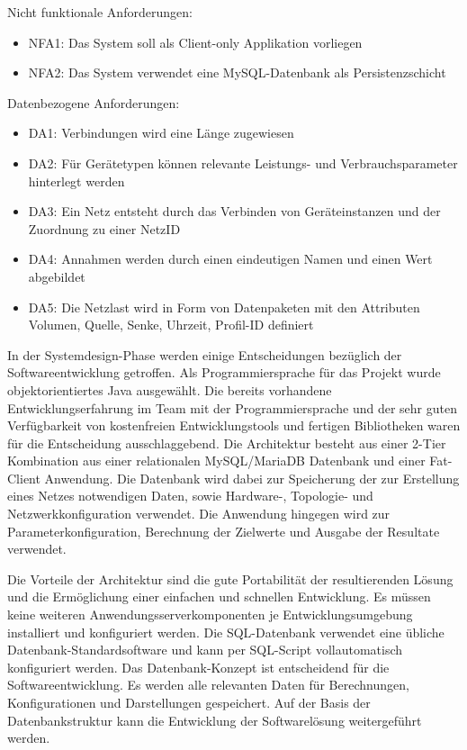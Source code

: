 Nicht funktionale Anforderungen:
\begin{itemize}
	\item NFA1: Das System soll als Client-only Applikation vorliegen
	\item NFA2: Das System verwendet eine MySQL-Datenbank als Persistenzschicht
\end{itemize}


Datenbezogene Anforderungen:
\begin{itemize}
	\item DA1: Verbindungen wird eine Länge zugewiesen
	\item DA2: Für Gerätetypen können relevante Leistungs- und Verbrauchsparameter hinterlegt werden
	\item DA3: Ein Netz entsteht durch das Verbinden von Geräteinstanzen und der Zuordnung zu einer NetzID
	\item DA4: Annahmen werden durch einen eindeutigen Namen und einen Wert abgebildet
	\item DA5:  Die Netzlast wird in Form von Datenpaketen mit den Attributen Volumen, Quelle, Senke, Uhrzeit, Profil-ID definiert
\end{itemize}


In der Systemdesign-Phase werden einige Entscheidungen bezüglich der Softwareentwicklung getroffen. Als Programmiersprache für das Projekt wurde objektorientiertes Java ausgewählt. Die bereits vorhandene Entwicklungserfahrung im Team mit der Programmiersprache und der sehr guten Verfügbarkeit von kostenfreien Entwicklungstools und fertigen Bibliotheken waren für die Entscheidung ausschlaggebend.
Die Architektur besteht aus einer 2-Tier Kombination aus einer relationalen MySQL/MariaDB Datenbank und einer Fat-Client Anwendung. Die Datenbank wird dabei zur Speicherung der zur Erstellung eines Netzes notwendigen Daten, sowie Hardware-, Topologie- und Netzwerkkonfiguration verwendet. Die Anwendung hingegen wird zur Parameterkonfiguration, Berechnung der Zielwerte und Ausgabe der Resultate verwendet.


Die Vorteile der Architektur sind die gute Portabilität der resultierenden Lösung und die Ermöglichung einer einfachen und schnellen Entwicklung. Es müssen keine weiteren Anwendungsserverkomponenten je Entwicklungsumgebung installiert und konfiguriert werden. Die SQL-Datenbank verwendet eine übliche Datenbank-Standardsoftware und kann per SQL-Script vollautomatisch konfiguriert werden.
Das Datenbank-Konzept ist entscheidend für die Softwareentwicklung. Es werden alle relevanten Daten für Berechnungen, Konfigurationen und Darstellungen gespeichert. Auf der Basis der Datenbankstruktur kann die Entwicklung der Softwarelösung weitergeführt werden.


